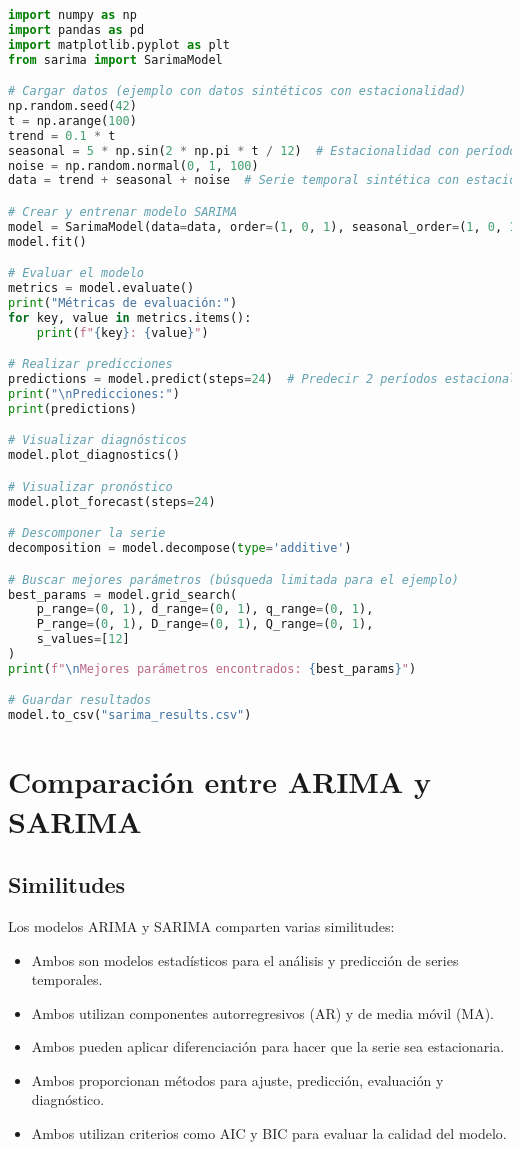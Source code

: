 \documentclass[12pt,letterpaper]{report}
\begin{document}
\begin{lstlisting}[language=python]
import numpy as np
import pandas as pd
import matplotlib.pyplot as plt
from sarima import SarimaModel

# Cargar datos (ejemplo con datos sintéticos con estacionalidad)
np.random.seed(42)
t = np.arange(100)
trend = 0.1 * t
seasonal = 5 * np.sin(2 * np.pi * t / 12)  # Estacionalidad con período 12
noise = np.random.normal(0, 1, 100)
data = trend + seasonal + noise  # Serie temporal sintética con estacionalidad

# Crear y entrenar modelo SARIMA
model = SarimaModel(data=data, order=(1, 0, 1), seasonal_order=(1, 0, 1, 12))
model.fit()

# Evaluar el modelo
metrics = model.evaluate()
print("Métricas de evaluación:")
for key, value in metrics.items():
    print(f"{key}: {value}")

# Realizar predicciones
predictions = model.predict(steps=24)  # Predecir 2 períodos estacionales
print("\nPredicciones:")
print(predictions)

# Visualizar diagnósticos
model.plot_diagnostics()

# Visualizar pronóstico
model.plot_forecast(steps=24)

# Descomponer la serie
decomposition = model.decompose(type='additive')

# Buscar mejores parámetros (búsqueda limitada para el ejemplo)
best_params = model.grid_search(
    p_range=(0, 1), d_range=(0, 1), q_range=(0, 1),
    P_range=(0, 1), D_range=(0, 1), Q_range=(0, 1),
    s_values=[12]
)
print(f"\nMejores parámetros encontrados: {best_params}")

# Guardar resultados
model.to_csv("sarima_results.csv")
\end{lstlisting}

\chapter{Comparación entre ARIMA y SARIMA}

\section{Similitudes}
Los modelos ARIMA y SARIMA comparten varias similitudes:

\begin{itemize}
    \item Ambos son modelos estadísticos para el análisis y predicción de series temporales.
    \item Ambos utilizan componentes autorregresivos (AR) y de media móvil (MA).
    \item Ambos pueden aplicar diferenciación para hacer que la serie sea estacionaria.
    \item Ambos proporcionan métodos para ajuste, predicción, evaluación y diagnóstico.
    \item Ambos utilizan criterios como AIC y BIC para evaluar la calidad del modelo.
\end{itemize}
\end{document}
